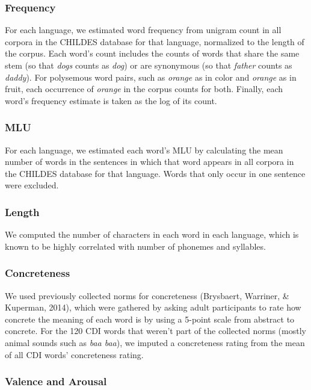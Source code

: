 \documentclass[10pt, letterpaper]{article}
\begin{document}
\subsubsection{Frequency}\label{frequency}

For each language, we estimated word frequency from unigram count in all
corpora in the CHILDES database for that language, normalized to the
length of the corpus. Each word's count includes the counts of words
that share the same stem (so that \emph{dogs} counts as \emph{dog}) or
are synonymous (so that \emph{father} counts as \emph{daddy}). For
polysemous word pairs, such as \emph{orange} as in color and
\emph{orange} as in fruit, each occurrence of \emph{orange} in the
corpus counts for both. Finally, each word's frequency estimate is taken
as the log of its count.

\subsubsection{MLU}\label{mlu}

For each language, we estimated each word's MLU by calculating the mean
number of words in the sentences in which that word appears in all
corpora in the CHILDES database for that language. Words that only occur
in one sentence were excluded.

\subsubsection{Length}\label{length}

We computed the number of characters in each word in each language,
which is known to be highly correlated with number of phonemes and
syllables.

\subsubsection{Concreteness}\label{concreteness}

We used previously collected norms for concreteness (Brysbaert,
Warriner, \& Kuperman, 2014), which were gathered by asking adult
participants to rate how concrete the meaning of each word is by using a
5-point scale from abstract to concrete. For the 120 CDI words that
weren't part of the collected norms (mostly animal sounds such as
\emph{baa baa}), we imputed a concreteness rating from the mean of all
CDI words' concreteness rating.

\subsubsection{Valence and Arousal}\label{valence-and-arousal}
\end{document}
